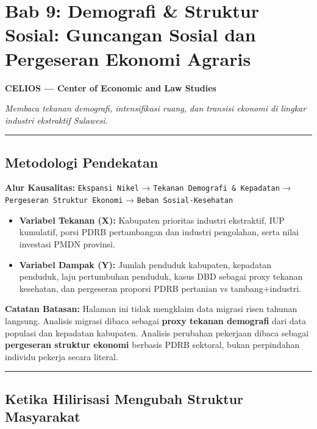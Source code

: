 \documentclass[
]{article}
\author{}
\date{}
\providecommand{\tightlist}{%
  \setlength{\itemsep}{0pt}\setlength{\parskip}{0pt}}
\begin{document}
\section{Bab 9: Demografi \& Struktur Sosial: Guncangan Sosial dan
Pergeseran Ekonomi
Agraris}\label{bab-9-demografi-struktur-sosial-guncangan-sosial-dan-pergeseran-ekonomi-agraris}

\textbf{CELIOS --- Center of Economic and Law Studies}

\emph{Membaca tekanan demografi, intensifikasi ruang, dan transisi
ekonomi di lingkar industri ekstraktif Sulawesi.}

\begin{center}\rule{0.5\linewidth}{0.5pt}\end{center}

\subsection{Metodologi Pendekatan}\label{metodologi-pendekatan}

\textbf{Alur Kausalitas:} \texttt{Ekspansi\ Nikel} →
\texttt{Tekanan\ Demografi\ \&\ Kepadatan} →
\texttt{Pergeseran\ Struktur\ Ekonomi} →
\texttt{Beban\ Sosial-Kesehatan}

\begin{itemize}
\tightlist
\item
  \textbf{Variabel Tekanan (X):} Kabupaten prioritas industri
  ekstraktif, IUP kumulatif, porsi PDRB pertambangan dan industri
  pengolahan, serta nilai investasi PMDN provinsi.
\item
  \textbf{Variabel Dampak (Y):} Jumlah penduduk kabupaten, kepadatan
  penduduk, laju pertumbuhan penduduk, kasus DBD sebagai proxy tekanan
  kesehatan, dan pergeseran proporsi PDRB pertanian vs tambang+industri.
\end{itemize}

\textbf{Catatan Batasan:} Halaman ini tidak mengklaim data migrasi risen
tahunan langsung. Analisis migrasi dibaca sebagai \textbf{proxy tekanan
demografi} dari data populasi dan kepadatan kabupaten. Analisis
perubahan pekerjaan dibaca sebagai \textbf{pergeseran struktur ekonomi}
berbasis PDRB sektoral, bukan perpindahan individu pekerja secara
literal.

\begin{center}\rule{0.5\linewidth}{0.5pt}\end{center}

\subsection{Ketika Hilirisasi Mengubah Struktur
Masyarakat}\label{ketika-hilirisasi-mengubah-struktur-masyarakat}
\end{document}
